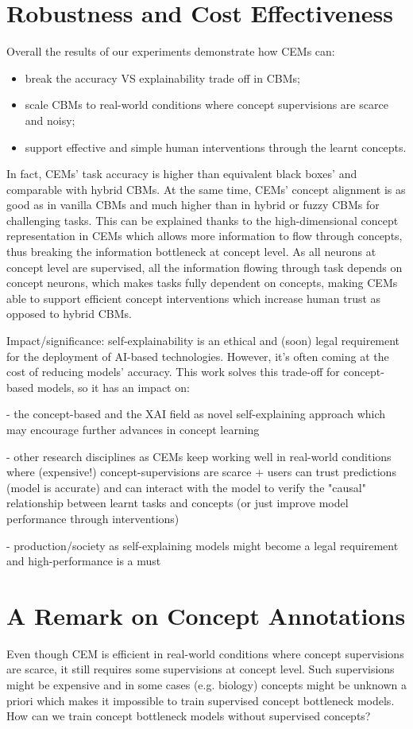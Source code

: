 \documentclass[withindex,glossary]{cam-thesis}
\theoremstyle{plain}
\theoremstyle{definition}
\theoremstyle{remark}
\begin{document}
\section{Robustness and Cost Effectiveness}
Overall the results of our experiments demonstrate how CEMs can:
\begin{itemize}
	\item break the accuracy VS explainability trade off in CBMs;
	\item scale CBMs to real-world conditions where concept supervisions are scarce and noisy;
	\item support effective and simple human interventions through the learnt concepts.
\end{itemize}
In fact, CEMs' task accuracy is higher than equivalent black boxes' and comparable with hybrid CBMs. At the same time, CEMs' concept alignment is as good as in vanilla CBMs and much higher than in hybrid or fuzzy CBMs for challenging tasks. This can be explained thanks to the high-dimensional concept representation in CEMs which allows more information to flow through concepts, thus breaking the information bottleneck at concept level. As all neurons at concept level are supervised, all the information flowing through task depends on concept neurons, which makes tasks fully dependent on concepts, making CEMs able to support efficient concept interventions which increase human trust as opposed to hybrid CBMs.



Impact/significance: self-explainability is an ethical and (soon) legal requirement for the deployment of AI-based technologies. However, it's often coming at the cost of reducing models' accuracy. This work solves this trade-off for concept-based models, so it has an impact on:

- the concept-based and the XAI field as novel self-explaining approach which may encourage further advances in concept learning

- other research disciplines as CEMs keep working well in real-world conditions where (expensive!) concept-supervisions are scarce + users can trust predictions (model is accurate) and can interact with the model to verify the "causal" relationship between learnt tasks and concepts (or just improve model performance through interventions)

- production/society as self-explaining models might become a legal requirement and high-performance is a must

\section{A Remark on Concept Annotations}
Even though CEM is efficient in real-world conditions where concept supervisions are scarce, it still requires some supervisions at concept level. Such supervisions might be expensive and in some cases (e.g. biology) concepts might be unknown a priori which makes it impossible to train supervised concept bottleneck models. How can we train concept bottleneck models without supervised concepts?
\end{document}
